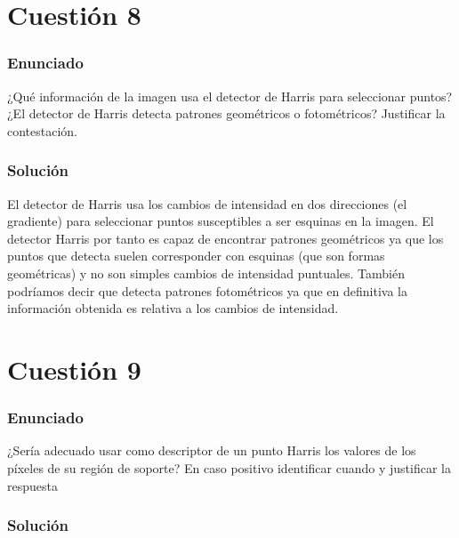 
\section{Cuestión 8}

\subsubsection{Enunciado}

¿Qué información de la imagen usa el detector de Harris para seleccionar puntos? ¿El detector de Harris detecta patrones geométricos o fotométricos? Justificar la contestación.

\subsubsection{Solución}

El detector de Harris usa los cambios de intensidad en dos direcciones (el gradiente) para seleccionar puntos susceptibles a ser esquinas en la imagen. El detector Harris por tanto es capaz de encontrar patrones geométricos ya que los puntos que detecta suelen corresponder con esquinas (que son formas geométricas) y no son simples cambios de intensidad puntuales. También podríamos decir que detecta patrones fotométricos ya que en definitiva la información obtenida es relativa a los cambios de intensidad.


\section{Cuestión 9}

\subsubsection{Enunciado}

¿Sería adecuado usar como descriptor de un punto Harris los valores de los píxeles de su región de soporte? En caso positivo identificar cuando y justificar la respuesta 

\subsubsection{Solución}

